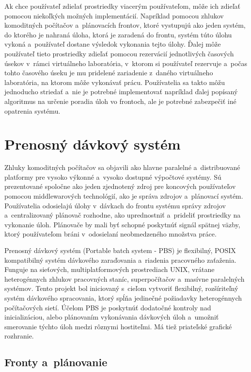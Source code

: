 Ak chce používateľ zdielať prostriedky viacerým používateľom, môže ich zdieľať pomocou niekoľkých možných implementácií. Napríklad pomocou zhlukov komoditných počítačov a~plánovacích frontov, ktoré vystupujú ako jeden systém, do ktorého je nahraná úloha, ktorá je zaradená do frontu, systém túto úlohu vykoná a~používateľ dostane výsledok vykonania tejto úlohy. Ďalej môže používateľ tieto prostriedky zdieľať pomocou rezervácií jednotlivých časových úsekov v~rámci virtuálneho laboratória, v~ktorom si používateľ rezervuje a~počas tohto časového úseku je mu pridelené zariadenie z~daného virtuálneho laboratória, na ktorom môže vykonávať prácu. Používatelia sa takto môžu jednoducho striedať a~nie je potrebné implementovať napríklad ďalej popísaný algoritmus na určenie poradia úloh vo frontoch, ale je potrebné zabezpečiť iné opatrenia systému.

\section{Prenosný dávkový systém}

Zhluky komoditných počítačov sa objavili ako hlavne paralelné a~distribuované platformy pre vysoko výkonné a~vysoko dostupné výpočtové systémy. Sú prezentované spoločne ako jeden zjednotený zdroj pre koncových používateľov pomocou middlewarových technológií, ako je správa zdrojov a~plánovací systém. Používatelia odosielajú úlohy v~dávkach do frontu systému správy zdrojov a~centralizovaný plánovač rozhodne, ako uprednostniť a~prideliť prostriedky na vykonanie úloh. Plánovače by mali byť schopné poskytnúť signál spätnej väzby, ktorý používateľom bráni v~odosielaní neobmedzeného množstva práce.~\cite{SherwaniJahanzeb2004Lace}

Prenosný dávkový systém (Portable batch system - PBS) je flexibilný, POSIX kompatibilný systém dávkového zaraďovania a~riadenia pracovného zaťaženia. Funguje na sieťových, multiplatformových prostrediach UNIX, vrátane heterogénnych zhlukov pracovných staníc, superpočítačov a~masívne paralelných systémov. Tento projekt bol iniciovaný s~cieľom vytvoriť flexibilný, rozšíriteľný systém dávkového spracovania, ktorý spĺňa jedinečné požiadavky heterogénnych počítačových sietí. Účelom PBS je poskytnúť dodatočné kontroly nad inicializáciou, alebo plánovaním vykonávania dávkových úloh a~umožniť smerovanie týchto úloh medzi rôznymi hostiteľmi. Má tiež priateľské grafické rozhranie.~\cite{SherwaniJahanzeb2004Lace}

\subsection{Fronty a~plánovanie}

